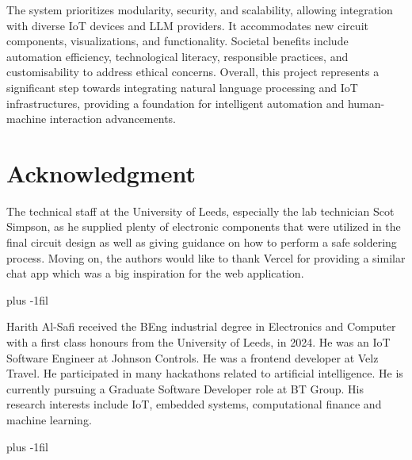 \documentclass{ieeeaccess}
\begin{document}
The system prioritizes modularity, security, and scalability, allowing integration with diverse IoT devices and LLM providers. It accommodates new circuit components, visualizations, and functionality. Societal benefits include automation efficiency, technological literacy, responsible practices, and customisability to address ethical concerns. Overall, this project represents a significant step towards integrating natural language processing and IoT infrastructures, providing a foundation for intelligent automation and human-machine interaction advancements. 

\section*{Acknowledgment}
The technical staff at the University of Leeds, especially the lab technician Scot Simpson, as he supplied plenty of electronic components that were utilized in the final circuit design as well as giving guidance on how to perform a safe soldering process. Moving on, the authors would like to thank Vercel for providing a similar chat app which was a big inspiration for the web application.




\baselineskip plus -1fil

\begin{IEEEbiography}{Harith Al-Safi} received the BEng industrial degree in Electronics and Computer with a first class honours from the University of Leeds, in 2024. He was an IoT Software Engineer at Johnson Controls. He was a frontend developer at Velz Travel.  He participated in many hackathons related to artificial intelligence. He is currently pursuing a Graduate Software Developer role at BT Group. His research interests include IoT, embedded systems, computational finance and machine learning.
\end{IEEEbiography}

\baselineskip plus -1fil
\end{document}
